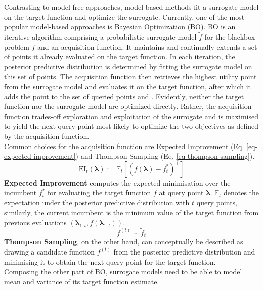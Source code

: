 \documentclass[twoside,11pt]{article}
\begin{document}
Contrasting to model-free approaches, model-based methods fit a surrogate model on the target function and optimize the surrogate.
Currently, one of the most popular model-based approaches is Bayesian Optimization (BO).
BO is an iterative algorithm comprising a probabilistic surrogate model $\tilde{f}$ for the blackbox problem $f$ and an acquisition function.
It maintains and continually extends a set of points it already evaluated on the target function.
In each iteration, the posterior predictive distribution is determined by fitting the surrogate model on this set of points.
The acquisition function then retrieves the highest utility point from the surrogate model and evaluates it on the target function, after which it adds the point
to the set of queried points \citep[p. 9]{feurer_hyperparameter_2019} and \citep[pp. 2f]{frazier2018tutorialbayesianoptimization}.
Evidently, neither the target function nor the surrogate model are optimized directly. Rather, the acquisition function trades-off exploration and exploitation of
the surrogate and is maximised to yield the next query point most likely to optimize the two objectives as defined by the acquisition function.
\\
Common choices for the acquisition function are Expected Improvement (Eq. \ref{eq-expected-improvement}) and Thompson Sampling (Eq. \ref{eq-thompson-sampling}).
\begin{equation}
  \text{EI}_t(\boldsymbol\lambda):=\mathbb{E}_t[(f(\boldsymbol\lambda)-f_t^*)^+]
  \label{eq-expected-improvement}
\end{equation}
\textbf{Expected Improvement} computes the expected minimisation over the incumbent $f_t^*$ for evaluating the target function $f$ at query point $\boldsymbol\lambda$.
$\mathbb{E}_t$ denotes the expectation under the posterior predictive distribution with $t$ query points, similarly, the current incumbent is the minimum value
of the target function from previous evaluations $(\boldsymbol\lambda_{1:t},f(\boldsymbol\lambda_{1:t}))$. \citep[p. 7]{frazier2018tutorialbayesianoptimization}
\begin{equation}
  f^{(t)}\sim\tilde{f}_t
  \label{eq-thompson-sampling}
\end{equation}
\textbf{Thompson Sampling}, on the other hand, can conceptually be described as drawing a candidate function $f^{(t)}$ from the posterior predictive distribution and
minimising it to obtain the next query point for the target function. \citep[p. 161]{7352306}
\\
Composing the other part of BO, surrogate models need to be able to model mean and variance of its target function estimate.
\end{document}
